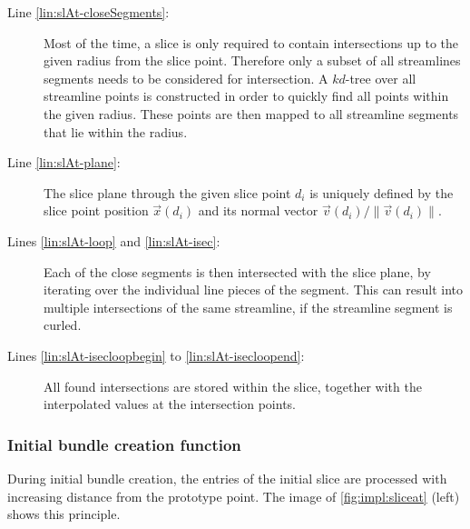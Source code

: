 \begin{description}
%
	\item[Line \ref{lin:slAt-closeSegments}:] Most of the time, a slice is only required to contain intersections up to the given radius from the slice point. Therefore only a subset of all streamlines segments needs to be considered for intersection. A $kd$-tree over all streamline points is constructed in order to quickly find all points within the given radius. These points are then mapped to all streamline segments that lie within the radius.
%
	\item[Line \ref{lin:slAt-plane}:] The slice plane through the given slice point $d_i$ is uniquely defined by the slice point position $\vec{x}(d_i)$ and its normal vector $\vec{v}(d_i)/\|\vec{v}(d_i)\|$.
%
	\item[Lines \ref{lin:slAt-loop} and \ref{lin:slAt-isec}:] Each of the close segments is then intersected with the slice plane, by iterating over the individual line pieces of the segment. This can result into multiple intersections of the same streamline, if the streamline segment is curled.
%
	\item[Lines \ref{lin:slAt-isecloopbegin} to \ref{lin:slAt-isecloopend}:] All found intersections are stored within the slice, together with the interpolated values at the intersection points.
%
\end{description}

\subsubsection{Initial bundle creation function}
\label{sec:impl:initial-bundle-creation}

During initial bundle creation, the entries of the initial slice are processed with increasing distance from the prototype point. The image of \autoref{fig:impl:sliceat} (left) shows this principle. 

